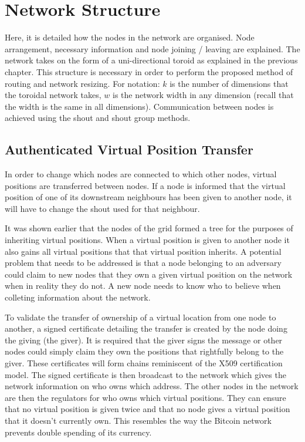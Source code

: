 \documentclass[ %
                    author={Luke Murray},
                supervisor={Dr. Simon Hollis},
                     title={Shadow Peer-to-Peer Networks},
                  subtitle={},
                    degree={MEng},
                      year={2013} ]{thesis}
\begin{document}
\section{Network Structure}

Here, it is detailed how the nodes in the network are organised. Node arrangement, necessary information and node joining / leaving are explained. The network takes on the form of a uni-directional toroid as explained in the previous chapter. This structure is necessary in order to perform the proposed method of routing and network resizing. For notation: $k$ is the number of dimensions that the toroidal network takes, $w$ is the network width in any dimension (recall that the width is the same in all dimensions). Communication between nodes is achieved using the shout and shout group methods.

\subsection{Authenticated Virtual Position Transfer}

In order to change which nodes are connected to which other nodes, virtual positions are transferred between nodes. If a node is informed that the virtual position of one of its downstream neighbours has been given to another node, it will have to change the shout used for that neighbour.

It was shown earlier that the nodes of the grid formed a tree for the purposes of inheriting virtual positions. When a virtual position is given to another node it also gains all virtual positions that that virtual position inherits. A potential problem that needs to be addressed is that a node belonging to an adversary could claim to new nodes that they own a given virtual position on the network when in reality they do not. A new node needs to know who to believe when colleting information about the network.

To validate the transfer of ownership of a virtual location from one node to another, a signed certificate detailing the transfer is created by the node doing the giving (the giver). It is required that the giver signs the message or other nodes could simply claim they own the positions that rightfully belong to the giver. These certificates will form chains reminiscent of the X509 certification model. The signed certificate is then broadcast to the network which gives the network information on who owns which address. The other nodes in the network are then the regulators for who owns which virtual positions. They can ensure that no virtual position is given twice and that no node gives a virtual position that it doesn't currently own. This resembles the way the Bitcoin network prevents double spending of its currency.
\end{document}
